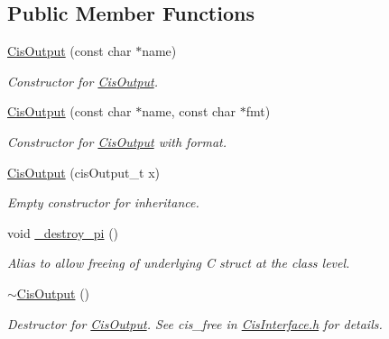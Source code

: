 \subsection*{Public Member Functions}
\begin{DoxyCompactItemize}
\item 
\mbox{\hyperlink{classCisOutput_acbe5281010e3dd4617006a03d9c6c06c}{Cis\+Output}} (const char $\ast$name)
\begin{DoxyCompactList}\small\item\em Constructor for \mbox{\hyperlink{classCisOutput}{Cis\+Output}}. \end{DoxyCompactList}\item 
\mbox{\hyperlink{classCisOutput_a276eaee68d97cba54726752784d6c4df}{Cis\+Output}} (const char $\ast$name, const char $\ast$fmt)
\begin{DoxyCompactList}\small\item\em Constructor for \mbox{\hyperlink{classCisOutput}{Cis\+Output}} with format. \end{DoxyCompactList}\item 
\mbox{\label{classCisOutput_abf373bf8e55beb4b32d558463b134a51}} 
\mbox{\hyperlink{classCisOutput_abf373bf8e55beb4b32d558463b134a51}{Cis\+Output}} (cis\+Output\+\_\+t x)
\begin{DoxyCompactList}\small\item\em Empty constructor for inheritance. \end{DoxyCompactList}\item 
\mbox{\label{classCisOutput_af977def262b778702e06277f5d50f102}} 
void \mbox{\hyperlink{classCisOutput_af977def262b778702e06277f5d50f102}{\+\_\+destroy\+\_\+pi}} ()
\begin{DoxyCompactList}\small\item\em Alias to allow freeing of underlying C struct at the class level. \end{DoxyCompactList}\item 
\mbox{\label{classCisOutput_a7dc7c92d8c50f61075d1ef0cf0dfce8f}} 
\mbox{\hyperlink{classCisOutput_a7dc7c92d8c50f61075d1ef0cf0dfce8f}{$\sim$\+Cis\+Output}} ()
\begin{DoxyCompactList}\small\item\em Destructor for \mbox{\hyperlink{classCisOutput}{Cis\+Output}}. See cis\+\_\+free in \mbox{\hyperlink{CisInterface_8h_source}{Cis\+Interface.\+h}} for details. \end{DoxyCompactList}\item 

\end{DoxyCompactItemize}

